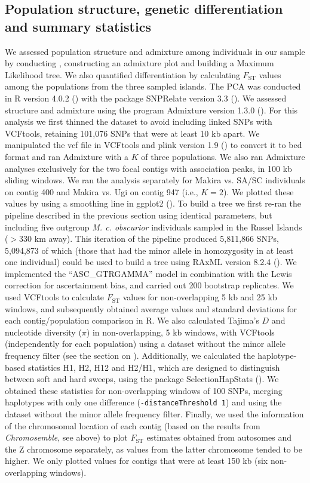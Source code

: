 \subsection{Population structure, genetic differentiation and summary statistics}
We assessed population structure and admixture among individuals in our sample by conducting , constructing an admixture plot and building a Maximum Likelihood tree. We also quantified differentiation by calculating $F_{\mathrm{ST}}$ values among the populations from the three sampled islands. The \ac{PCA} was conducted in R version 4.0.2 (\cite{r2021r}) with the package SNPRelate version 3.3 (\cite{zheng2012high}). We assessed structure and admixture using the program Admixture version 1.3.0 (\cite{alexander2009fast}). For this analysis we first thinned the dataset to avoid including linked \acsp{SNP} with VCFtools, retaining 101,076 SNPs that were at least 10 kb apart. We manipulated the vcf file in VCFtools and plink version 1.9 (\cite{purcell2007plink}) to convert it to bed format and ran Admixture with a $K$ of three populations. We also ran Admixture analyses exclusively for the two focal contigs with association peaks, in 100 kb sliding windows. We ran the analysis separately for Makira vs. \ac{SA/SC} individuals on contig 400 and Makira vs. Ugi on contig 947 (i.e., $K = 2$). We plotted these values by using a smoothing line in ggplot2 (\cite{wickham2016ggplot2}). To build a tree we first re-ran the pipeline described in the previous section using identical parameters, but including five outgroup \textit{M. c. obscurior} individuals sampled in the Russel Islands ($>330$ km away). This iteration of the pipeline produced 5,811,866 SNPs, 5,094,873 of which (those that had the minor allele in homozygosity in at least one individual) could be used to build a tree using RAxML version 8.2.4 (\cite{stamatakis2014raxml}). We implemented the “ASC\_GTRGAMMA” model in combination with the Lewis correction for ascertainment bias, and carried out 200 bootstrap replicates. We used VCFtools to calculate $F_{\mathrm{ST}}$ values for non-overlapping 5 kb and 25 kb windows, and subsequently obtained average values and standard deviations for each contig/population comparison in R. We also calculated Tajima’s $D$ and nucleotide diversity ($\pi$) in non-overlapping, 5 kb windows, with VCFtools (independently for each population) using a dataset without the minor allele frequency filter (see the section on ). Additionally, we calculated the haplotype-based statistics H1, H2, H12 and H2/H1, which are designed to distinguish between soft and hard sweeps, using the package SelectionHapStats (\cite{garud_recent_2015}). We obtained these statistics for non-overlapping windows of 100 \acsp{SNP}, merging haplotypes with only one difference (\texttt{-distanceThreshold 1}) and using the dataset without the minor allele frequency filter. Finally, we used the information of the chromosomal location of each contig (based on the results from \textit{Chromosemble}, see above) to plot $F_{\mathrm{ST}}$ estimates obtained from autosomes and the Z chromosome separately, as values from the latter chromosome tended to be higher. We only plotted values for contigs that were at least 150 kb (six non-overlapping windows).

